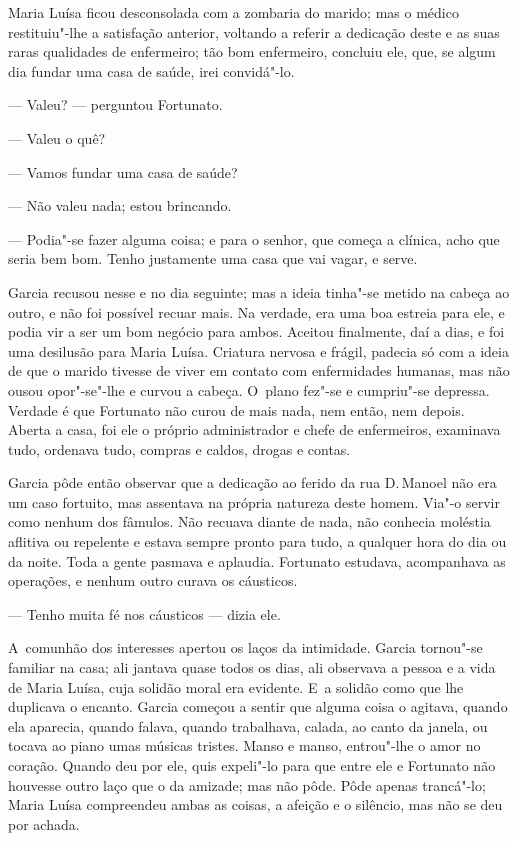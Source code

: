 \begin{linenumbers}
Maria Luísa ficou desconsolada com a zombaria do marido; mas o médico
restituiu"-lhe a satisfação anterior, voltando a referir a dedicação
deste e as suas raras qualidades de enfermeiro; tão bom enfermeiro,
concluiu ele, que, se algum dia fundar uma casa de saúde, irei
convidá"-lo.

--- Valeu? --- perguntou Fortunato.

--- Valeu o quê?

--- Vamos fundar uma casa de saúde?

--- Não valeu nada; estou brincando.

--- Podia"-se fazer alguma coisa; e para o senhor, que começa a clínica,
acho que seria bem bom. Tenho justamente uma casa que vai vagar, e
serve.

Garcia recusou nesse e no dia seguinte; mas a ideia tinha"-se metido na
cabeça ao outro, e não foi possível recuar mais. Na verdade, era uma boa
estreia para ele, e podia vir a ser um bom negócio para ambos. Aceitou
finalmente, daí a dias, e foi uma desilusão para Maria Luísa. Criatura
nervosa e frágil, padecia só com a ideia de que o marido tivesse de
viver em contato com enfermidades humanas, mas não ousou opor"-se"-lhe e
curvou a cabeça. O~plano fez"-se e cumpriu"-se depressa. Verdade é que
Fortunato não curou de mais nada, nem então, nem depois. Aberta a casa,
foi ele o próprio administrador e chefe de enfermeiros, examinava tudo,
ordenava tudo, compras e caldos, drogas e contas.

Garcia pôde então observar que a dedicação ao ferido da rua D.\,Manoel
não era um caso fortuito, mas assentava na própria natureza deste homem.
Via"-o servir como nenhum dos fâmulos. Não recuava diante de nada, não
conhecia moléstia aflitiva ou repelente e estava sempre pronto para
tudo, a qualquer hora do dia ou da noite. Toda a gente pasmava e
aplaudia. Fortunato estudava, acompanhava as operações, e nenhum outro
curava os cáusticos.

--- Tenho muita fé nos cáusticos --- dizia ele.

A~comunhão dos interesses apertou os laços da intimidade. Garcia
tornou"-se familiar na casa; ali jantava quase todos os dias, ali
observava a pessoa e a vida de Maria Luísa, cuja solidão moral era
evidente. E~a solidão como que lhe duplicava o encanto. Garcia começou a
sentir que alguma coisa o agitava, quando ela aparecia, quando falava,
quando trabalhava, calada, ao canto da janela, ou tocava ao piano umas
músicas tristes. Manso e manso, entrou"-lhe o amor no coração. Quando deu
por ele, quis expeli"-lo para que entre ele e Fortunato não houvesse
outro laço que o da amizade; mas não pôde. Pôde apenas trancá"-lo; Maria
Luísa compreendeu ambas as coisas, a afeição e o silêncio, mas não se
deu por achada.


\end{linenumbers}
